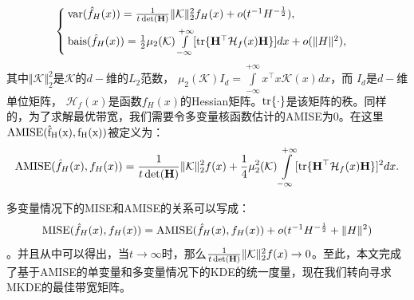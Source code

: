 \begin{align}\label{Mvar_baisforrmula}
\begin{cases}
{\rm var} (\hat{f}_{H}(x)) =\frac{1}{t\mathop{\rm{det}}({\mathbf{H}})}\Vert{\mathcal{K}\Vert^{2}_{2}}f_{H}(x) + o(t^{-1}H^{-\frac{1}{2}}),\\[0.5em]
{\rm bais}(\hat{f}_{H}(x))=\frac{1}{2}\mu_{2}(\mathcal{K})
\int\limits_{-\infty}^{+\infty}[\hbox{tr}\{\mathbf{H}^{\top}\mathcal{H}_{f}(x)\mathbf{H}\}]dx
+ o(\Vert H\Vert ^{2}),
\end{cases}
\end{align}
其中$\Vert{\mathcal{K}\Vert^{2}_{2}}$是$\mathcal{K}$的$d-$维的$L_{2}$范数， $\mu_{2}(\mathcal{K}) I_{d}=\int\limits_{-\infty}^{+\infty} x^{\top}x\mathcal{K}(x) dx $，而 $I_{d}$是$d-$维单位矩阵， $\mathcal{H}_{f}(x)$是函数${f}_{H}(x)$的Hessian矩阵。$\hbox{tr}\{\cdot\}$是该矩阵的秩。同样的，为了求解最优带宽，我们需要令多变量核函数估计的AMISE为0。在这里$\rm{AMISE}(\hat{f}_{H}(x), f_{H}(x))$被定义为：
\begin{align}\label{MAMISEforrmula}
{\rm AMISE}(\hat{f}_{H}(x), f_{H}(x)) = \frac{1}{t\mathop{\rm{det}}({\mathbf{H}})}\Vert{\mathcal{K}\Vert^{2}_{2}}f(x)
+ \frac{1}{4}\mu^{2}_{2}(\mathcal{K})\int\limits_{-\infty}^{+\infty}
[\hbox{tr}\{\mathbf{H}^{\top}\mathcal{H}_{f}(x)\mathbf{H}\}]^{2}dx.
\end{align}

多变量情况下的MISE和AMISE的关系可以写成：$${\rm MISE}(\hat{f}_{H}(x), f_{H}(x)) = {\rm {\rm AMISE}}(\hat{f}_{H}(x), f_{H}(x)) + o(t^{-1}H^{-\frac{1}{2}}+\Vert H\Vert ^{2})$$。并且从中可以得出，当$t\rightarrow \infty$时，那么$\frac{1}{t\mathop{\rm{det}}({\mathbf{H}})}\Vert{\mathcal{K}\Vert^{2}_{2}}f(x)\rightarrow 0$。至此，本文完成了基于AMISE的单变量和多变量情况下的KDE的统一度量，现在我们转向寻求MKDE的最佳带宽矩阵。

